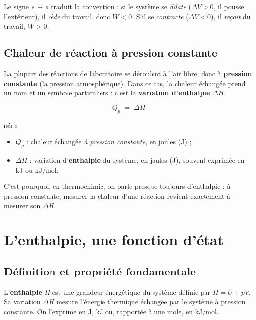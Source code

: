 \documentclass[11pt,a4paper]{article}
\newenvironment{ou}{%
  \par\smallskip\noindent\textbf{où :}\nopagebreak
  \begin{itemize}[leftmargin=1.8em,topsep=2pt,itemsep=1.5pt,parsep=0pt]}%
  {\end{itemize}}
\newcommand{\dH}{\Delta H}
\begin{document}
\begin{remarque}
Le signe « $-$ » traduit la convention : si le système se \emph{dilate} ($\Delta V>0$, il pousse
l'extérieur), il \emph{cède} du travail, donc $W<0$. S'il se \emph{contracte} ($\Delta V<0$), il
\emph{reçoit} du travail, $W>0$.
\end{remarque}

\subsection{Chaleur de réaction à pression constante}

La plupart des réactions de laboratoire se déroulent à l'air libre, donc à \textbf{pression constante}
(la pression atmosphérique). Dans ce cas, la chaleur échangée prend un nom et un symbole particuliers :
c'est la \textbf{variation d'enthalpie} $\dH$.

\begin{formule}
\[ \boxed{\;Q_p \;=\; \dH\;} \]
\begin{ou}
  \item $Q_p$ : chaleur échangée \emph{à pression constante}, en joules ($\si{\joule}$) ;
  \item $\dH$ : variation d'\textbf{enthalpie} du système, en joules ($\si{\joule}$), souvent exprimée en $\si{\kilo\joule}$ ou $\si{\kilo\joule\per\mol}$.
\end{ou}
\end{formule}

C'est pourquoi, en thermochimie, on parle presque toujours d'enthalpie : à pression constante, mesurer
la chaleur d'une réaction revient exactement à mesurer son $\dH$.

\section{L'enthalpie, une fonction d'état}
\subsection{Définition et propriété fondamentale}

\begin{definition}[enthalpie $H$]
L'\textbf{enthalpie} $H$ est une grandeur énergétique du système définie par $H = U + pV$. Sa variation
$\dH$ mesure l'énergie thermique échangée par le système à pression constante. On l'exprime en
$\si{\joule}$, $\si{\kilo\joule}$ ou, rapportée à une mole, en $\si{\kilo\joule\per\mol}$.
\end{definition}
\end{document}
